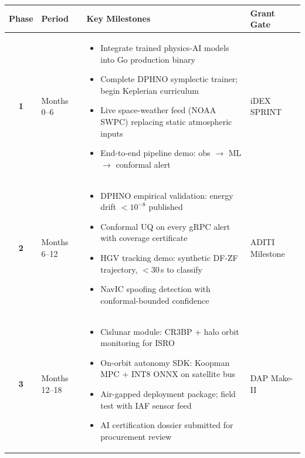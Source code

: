\documentclass[11pt,a4paper]{article}
\begin{document}
\renewcommand{\arraystretch}{1.3}
\begin{tabularx}{\textwidth}{c l Y l}
\toprule
\textbf{Phase} & \textbf{Period} & \textbf{Key Milestones} & \textbf{Grant Gate} \\
\midrule
\textbf{1} & Months 0--6 &
\begin{minipage}[t]{\linewidth}\vspace{-0.5em}
\begin{itemize}[nosep,leftmargin=1em]
\item Integrate trained physics-AI models into Go production binary
\item Complete DPHNO symplectic trainer; begin Keplerian curriculum
\item Live space-weather feed (NOAA SWPC) replacing static atmospheric inputs
\item End-to-end pipeline demo: obs $\to$ ML $\to$ conformal alert
\end{itemize}\vspace{0.3em}
\end{minipage} & iDEX SPRINT \\
\midrule
\textbf{2} & Months 6--12 &
\begin{minipage}[t]{\linewidth}\vspace{-0.5em}
\begin{itemize}[nosep,leftmargin=1em]
\item DPHNO empirical validation: energy drift $< 10^{-8}$ published
\item Conformal UQ on every gRPC alert with coverage certificate
\item HGV tracking demo: synthetic DF-ZF trajectory, $<$30\,s to classify
\item NavIC spoofing detection with conformal-bounded confidence
\end{itemize}\vspace{0.3em}
\end{minipage} & ADITI Milestone \\
\midrule
\textbf{3} & Months 12--18 &
\begin{minipage}[t]{\linewidth}\vspace{-0.5em}
\begin{itemize}[nosep,leftmargin=1em]
\item Cislunar module: CR3BP + halo orbit monitoring for ISRO
\item On-orbit autonomy SDK: Koopman MPC + INT8 ONNX on satellite bus
\item Air-gapped deployment package; field test with IAF sensor feed
\item AI certification dossier submitted for procurement review
\end{itemize}\vspace{0.3em}
\end{minipage} & DAP Make-II \\
\bottomrule
\end{tabularx}
\end{document}
